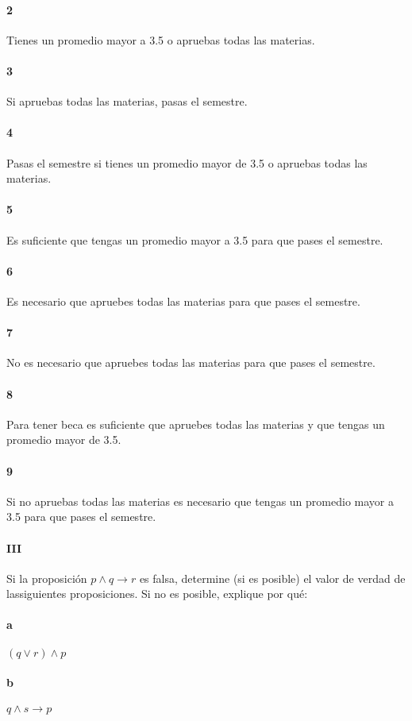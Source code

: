 \documentclass{article}
\begin{document}
	\paragraph{2} Tienes un promedio mayor a 3.5 o apruebas todas las materias.
	\paragraph{3} Si apruebas todas las materias, pasas el semestre.
	\paragraph{4} Pasas el semestre si tienes un promedio mayor de 3.5 o apruebas todas las materias.
	\paragraph{5} Es suficiente que tengas un promedio mayor a 3.5 para que pases el semestre.
	\paragraph{6} Es necesario que apruebes todas las materias para que pases el semestre.
	\paragraph{7} No es necesario que apruebes todas las materias para que pases el semestre.
	\paragraph{8} Para tener beca es suficiente que apruebes todas las materias y que tengas un promedio mayor de 3.5.
	\paragraph{9} Si no apruebas todas las materias es necesario que tengas un promedio mayor a 3.5 para que pases el semestre.
	\paragraph{III} Si la proposición $p \land q \rightarrow r$ es falsa, determine (si es posible) el valor de verdad de lassiguientes proposiciones. Si no es posible, explique por qué:
	\paragraph{a} $(q \lor r) \land p$
	\paragraph{b} $q \land s \rightarrow p$
\end{document}
